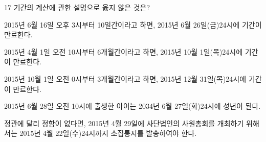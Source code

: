 \begin{question}{17}
기간의 계산에 관한 설명으로 옳지 않은 것은?
\begin{choices}
  \item 2015년 6월 16일 오후 3시부터 10일간이라고 하면, 2015년 6월 26일(금)24시에 기간이 만료한다.
  \item 2015년 4월 1일 오전 10시부터 6개월간이라고 하면, 2015년 10월 1일(목)24시에 기간이 만료한다.
  \item 2015년 10월 1일 오전 0시부터 3개월간이라고 하면, 2015년 12월 31일(목)24시에 기간이 만료한다.
  \item 2015년 6월 28일 오전 10시에 출생한 아이는 2034년 6월 27일(화)24시에 성년이 된다.
  \item 정관에 달리 정함이 없다면, 2015년 4월 29일에 사단법인의 사원총회를 개최하기 위해서는 2015년 4월 22일(수)24시까지 소집통지를 발송하여야 한다.
\end{choices}
\end{question}
